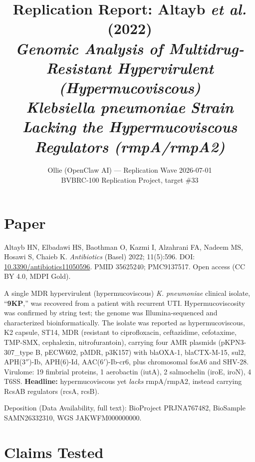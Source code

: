 \documentclass[11pt]{article}
\title{Replication Report: Altayb \textit{et al.} (2022)\\
\textit{Genomic Analysis of Multidrug-Resistant Hypervirulent (Hypermucoviscous)}\\
\textit{Klebsiella pneumoniae} \textit{Strain Lacking the Hypermucoviscous Regulators (rmpA/rmpA2)}}
\author{Ollie (OpenClaw AI) --- Replication Wave 2026-07-01\\
BVBRC-100 Replication Project, target \#33}
\date{}
\begin{document}
\maketitle

\begin{center}
\end{center}

\section{Paper}

Altayb HN, Elbadawi HS, Baothman O, Kazmi I, Alzahrani FA, Nadeem MS, Hosawi S, Chaieb K.
\textit{Antibiotics} (Basel) 2022; 11(5):596. DOI: \href{https://doi.org/10.3390/antibiotics11050596}{10.3390/antibiotics11050596}.
PMID 35625240; PMC9137517. Open access (CC BY 4.0, MDPI Gold).

A single MDR hypervirulent (hypermucoviscous) \textit{K. pneumoniae} clinical isolate, ``\textbf{9KP},'' was recovered from a patient with recurrent UTI. Hypermucoviscosity was confirmed by string test; the genome was Illumina-sequenced and characterized bioinformatically. The isolate was reported as hypermucoviscous, K2 capsule, ST14, MDR (resistant to ciprofloxacin, ceftazidime, cefotaxime, TMP-SMX, cephalexin, nitrofurantoin), carrying four AMR plasmids (pKPN3-307\_type B, pECW602, pMDR, p3K157) with blaOXA-1, blaCTX-M-15, sul2, APH(3$''$)-Ib, APH(6)-Id, AAC(6$'$)-Ib-cr6, plus chromosomal fosA6 and SHV-28. Virulome: 19 fimbrial proteins, 1 aerobactin (iutA), 2 salmochelin (iroE, iroN), 4 T6SS. \textbf{Headline:} hypermucoviscous yet \emph{lacks} rmpA/rmpA2, instead carrying RcsAB regulators (rcsA, rcsB).

Deposition (Data Availability, full text): BioProject PRJNA767482, BioSample SAMN26332310, WGS JAKWFM000000000.

\section{Claims Tested}
\end{document}
